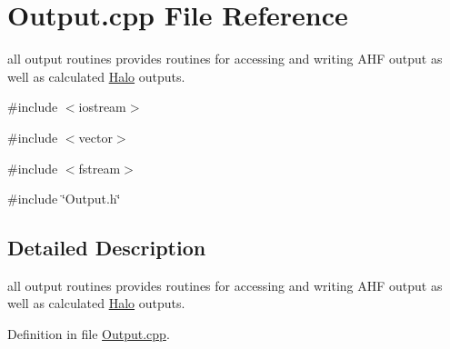\section{Output.cpp File Reference}
\label{Output_8cpp}


all output routines provides routines for accessing and writing AHF output as well as calculated \hyperlink{classHalo}{Halo} outputs.  


{\ttfamily \#include $<$iostream$>$}\par
{\ttfamily \#include $<$vector$>$}\par
{\ttfamily \#include $<$fstream$>$}\par
{\ttfamily \#include \char`\"{}Output.h\char`\"{}}\par


\subsection{Detailed Description}
all output routines provides routines for accessing and writing AHF output as well as calculated \hyperlink{classHalo}{Halo} outputs. 

Definition in file \hyperlink{Output_8cpp_source}{Output.cpp}.

